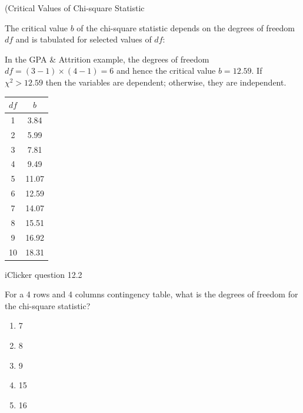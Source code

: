 \documentclass[14pt]{beamer}\usepackage[]{graphicx}\usepackage[]{color}
\begin{document}
\begin{frame}[fragile]{(Critical Values of Chi-square Statistic}

\begin{minipage}[ht]{8cm}

The critical value $b$ of the chi-square statistic depends on the degrees  of freedom $df$ and is tabulated for selected values of $df$:

 \vspace{4mm}
 
In the GPA \& Attrition example, the degrees of freedom \\
$df = (3 - 1) \times (4 - 1) = 6$ and hence the critical value $b = 12.59$. If $\chi^2 > 12.59$ then the variables are dependent; otherwise, they are independent.

\end{minipage} \hfill
\begin{minipage}[ht]{3cm}

{\small{
\begin{tabular}{@{} cc @{}} \hline
$df$ & $b$ \\ \hline
1 & 3.84 \\
2 & 5.99 \\
3 & 7.81 \\
4 & 9.49 \\
5 & 11.07 \\
6 & 12.59 \\
7 & 14.07 \\
8 & 15.51 \\
9 & 16.92 \\
10 & 18.31 \\ \hline
\end{tabular}
}}
\end{minipage}

\end{frame}

\begin{frame}[fragile]{iClicker question 12.2}

For a 4 rows and 4 columns contingency table, what is the degrees of  freedom for the chi-square statistic?

\begin{enumerate}
\item 7
\item 8
\item 9
\item 15
\item 16
\end{enumerate}

\end{frame}
\end{document}

